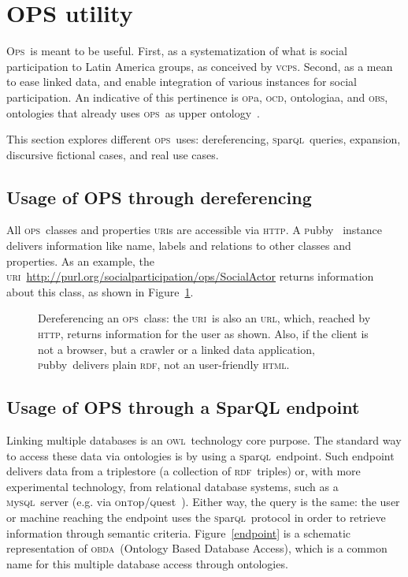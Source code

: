\documentclass[10pt,letterpaper]{article}
\newcommand{\ops}{\textsc{ops}}
\newcommand{\opsi}{O\textsc{ps}}
\newcommand{\vcps}{\textsc{vcps}}
\newcommand{\owl}{\textsc{owl}}
\newcommand{\sparql}{\textsc{s}par\textsc{ql}}
\newcommand{\html}{\textsc{html}}
\newcommand{\uri}{\textsc{uri}}
\newcommand{\urll}{\textsc{url}}
\newcommand{\http}{\textsc{http}}
\newcommand{\opa}{\textsc{op}a}
\newcommand{\ocd}{\textsc{ocd}}
\newcommand{\ontologiaa}{\textsc{o}ntologiaa}
\newcommand{\obs}{\textsc{obs}}
\newcommand{\pubby}{\textsc{p}ubby}
\newcommand{\rdf}{\textsc{rdf}}
\newcommand{\mysql}{\textsc{m}y\textsc{sql}}
\newcommand{\ontop}{\textsc{o}n\textsc{t}op}
\newcommand{\quest}{\textsc{q}uest}
\newcommand{\obda}{\textsc{obda}}
\begin{document}
\section{OPS utility}\label{ospUtil}
\opsi\ is meant to be useful. First, as a systematization of what is social participation to Latin America groups, as conceived by \vcps. Second, as a mean to ease linked data, and enable integration of various instances for social participation. An indicative of this pertinence is \opa, \ocd, \ontologiaa, and \obs, ontologies that already uses \ops\ as upper ontology~\cite{pnud5}.

This section explores different \ops\ uses: dereferencing, \sparql\ queries, expansion, discursive fictional cases, and real use cases.

\subsection{Usage of OPS through dereferencing}

All \ops\ classes and properties \uri s are accessible via \http. A \pubby~\cite{pubby} instance delivers information like name, labels and relations to other classes and properties. As an example, the \uri\ \url{http://purl.org/socialparticipation/ops/SocialActor} returns information about this class, as shown in Figure~\ref{fig:deref}.

\begin{figure}[!h]
    \centering
    \caption{Dereferencing an \ops\ class: the \uri\ is also an \urll, which, reached by \http, returns information for the user as shown. Also, if the client is not a browser, but a crawler or a linked data application, \pubby\ delivers plain \rdf, not an user-friendly \html.}
    \label{fig:deref}
\end{figure}

\subsection{Usage of OPS through a SparQL endpoint}

Linking multiple databases is an \owl\ technology core purpose. The standard way to access these data via ontologies is by using a \sparql\ endpoint. Such endpoint delivers data from a triplestore (a collection of \rdf\ triples) or, with more experimental technology, from relational database systems, such as a \mysql\ server (e.g. via \ontop/\quest~\cite{onTop}). Either way, the query is the same: the user or machine reaching the endpoint uses the \sparql\ protocol in order to retrieve information through semantic criteria. Figure~\ref{endpoint} is a schematic representation of \obda\ (Ontology Based Database Access), which is a common name for this multiple database access through ontologies.
\end{document}
